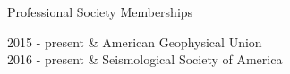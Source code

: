 \begin{rSection}{Professional Society Memberships}
	\begin{timeline}
		2015 - present & American Geophysical Union \smallskip \\
		2016 - present & Seismological Society of America
	\end{timeline}
\end{rSection}

